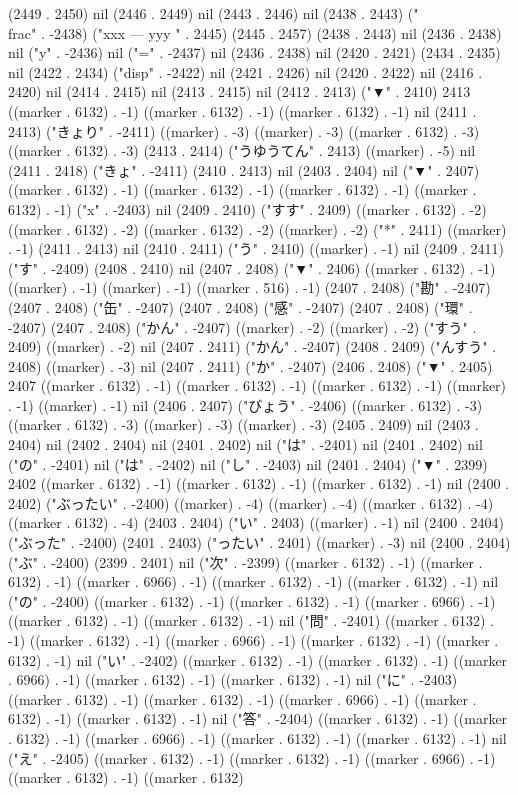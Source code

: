 (2449 . 2450) nil (2446 . 2449) nil (2443 . 2446) nil (2438 . 2443) ("\\frac" . -2438) ("xxx
---
yyy
" . 2445) (2445 . 2457) (2438 . 2443) nil (2436 . 2438) nil ("y" . -2436) nil ("=" . -2437) nil (2436 . 2438) nil (2420 . 2421) (2434 . 2435) nil (2422 . 2434) ("disp" . -2422) nil (2421 . 2426) nil (2420 . 2422) nil (2416 . 2420) nil (2414 . 2415) nil (2413 . 2415) nil (2412 . 2413) ("▼" . 2410) 2413 ((marker . 6132) . -1) ((marker . 6132) . -1) ((marker . 6132) . -1) nil (2411 . 2413) ("きょり" . -2411) ((marker) . -3) ((marker) . -3) ((marker . 6132) . -3) ((marker . 6132) . -3) (2413 . 2414) ("うゆうてん" . 2413) ((marker) . -5) nil (2411 . 2418) ("きょ" . -2411) (2410 . 2413) nil (2403 . 2404) nil ("▼" . 2407) ((marker . 6132) . -1) ((marker . 6132) . -1) ((marker . 6132) . -1) ((marker . 6132) . -1) ("x" . -2403) nil (2409 . 2410) ("すす" . 2409) ((marker . 6132) . -2) ((marker . 6132) . -2) ((marker . 6132) . -2) ((marker) . -2) ("*" . 2411) ((marker) . -1) (2411 . 2413) nil (2410 . 2411) ("う" . 2410) ((marker) . -1) nil (2409 . 2411) ("す" . -2409) (2408 . 2410) nil (2407 . 2408) ("▼" . 2406) ((marker . 6132) . -1) ((marker) . -1) ((marker) . -1) ((marker . 516) . -1) (2407 . 2408) ("勘" . -2407) (2407 . 2408) ("缶" . -2407) (2407 . 2408) ("感" . -2407) (2407 . 2408) ("環" . -2407) (2407 . 2408) ("かん" . -2407) ((marker) . -2) ((marker) . -2) ("すう" . 2409) ((marker) . -2) nil (2407 . 2411) ("かん" . -2407) (2408 . 2409) ("んすう" . 2408) ((marker) . -3) nil (2407 . 2411) ("か" . -2407) (2406 . 2408) ("▼" . 2405) 2407 ((marker . 6132) . -1) ((marker . 6132) . -1) ((marker . 6132) . -1) ((marker) . -1) ((marker) . -1) nil (2406 . 2407) ("びょう" . -2406) ((marker . 6132) . -3) ((marker . 6132) . -3) ((marker) . -3) ((marker) . -3) (2405 . 2409) nil (2403 . 2404) nil (2402 . 2404) nil (2401 . 2402) nil ("は" . -2401) nil (2401 . 2402) nil ("の" . -2401) nil ("は" . -2402) nil ("し" . -2403) nil (2401 . 2404) ("▼" . 2399) 2402 ((marker . 6132) . -1) ((marker . 6132) . -1) ((marker . 6132) . -1) nil (2400 . 2402) ("ぶったい" . -2400) ((marker) . -4) ((marker) . -4) ((marker . 6132) . -4) ((marker . 6132) . -4) (2403 . 2404) ("い" . 2403) ((marker) . -1) nil (2400 . 2404) ("ぶった" . -2400) (2401 . 2403) ("ったい" . 2401) ((marker) . -3) nil (2400 . 2404) ("ぶ" . -2400) (2399 . 2401) nil ("次" . -2399) ((marker . 6132) . -1) ((marker . 6132) . -1) ((marker . 6966) . -1) ((marker . 6132) . -1) ((marker . 6132) . -1) nil ("の" . -2400) ((marker . 6132) . -1) ((marker . 6132) . -1) ((marker . 6966) . -1) ((marker . 6132) . -1) ((marker . 6132) . -1) nil ("問" . -2401) ((marker . 6132) . -1) ((marker . 6132) . -1) ((marker . 6966) . -1) ((marker . 6132) . -1) ((marker . 6132) . -1) nil ("い" . -2402) ((marker . 6132) . -1) ((marker . 6132) . -1) ((marker . 6966) . -1) ((marker . 6132) . -1) ((marker . 6132) . -1) nil ("に" . -2403) ((marker . 6132) . -1) ((marker . 6132) . -1) ((marker . 6966) . -1) ((marker . 6132) . -1) ((marker . 6132) . -1) nil ("答" . -2404) ((marker . 6132) . -1) ((marker . 6132) . -1) ((marker . 6966) . -1) ((marker . 6132) . -1) ((marker . 6132) . -1) nil ("え" . -2405) ((marker . 6132) . -1) ((marker . 6132) . -1) ((marker . 6966) . -1) ((marker . 6132) . -1) ((marker . 6132) 